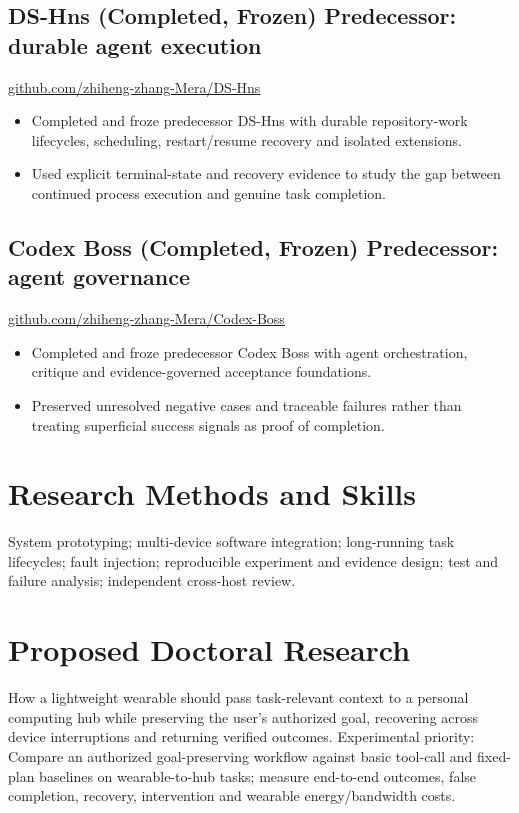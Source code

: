 \documentclass[10pt,a4paper]{article}
\begin{document}
\subsection*{DS-Hns (Completed, Frozen) \hfill \small Predecessor: durable agent execution}
\href{https://github.com/zhiheng-zhang-Mera/DS-Hns}{github.com/zhiheng-zhang-Mera/DS-Hns}
\begin{itemize}
\item Completed and froze predecessor DS-Hns with durable repository-work lifecycles, scheduling, restart/resume recovery and isolated extensions.
\item Used explicit terminal-state and recovery evidence to study the gap between continued process execution and genuine task completion.
\end{itemize}

\subsection*{Codex Boss (Completed, Frozen) \hfill \small Predecessor: agent governance}
\href{https://github.com/zhiheng-zhang-Mera/Codex-Boss}{github.com/zhiheng-zhang-Mera/Codex-Boss}
\begin{itemize}
\item Completed and froze predecessor Codex Boss with agent orchestration, critique and evidence-governed acceptance foundations.
\item Preserved unresolved negative cases and traceable failures rather than treating superficial success signals as proof of completion.
\end{itemize}

\section{Research Methods and Skills}
System prototyping; multi-device software integration; long-running task lifecycles; fault injection; reproducible experiment and evidence design; test and failure analysis; independent cross-host review.

\section{Proposed Doctoral Research}
How a lightweight wearable should pass task-relevant context to a personal computing hub while preserving the user's authorized goal, recovering across device interruptions and returning verified outcomes. Experimental priority: Compare an authorized goal-preserving workflow against basic tool-call and fixed-plan baselines on wearable-to-hub tasks; measure end-to-end outcomes, false completion, recovery, intervention and wearable energy/bandwidth costs.

\par\smallskip{}
\end{document}
